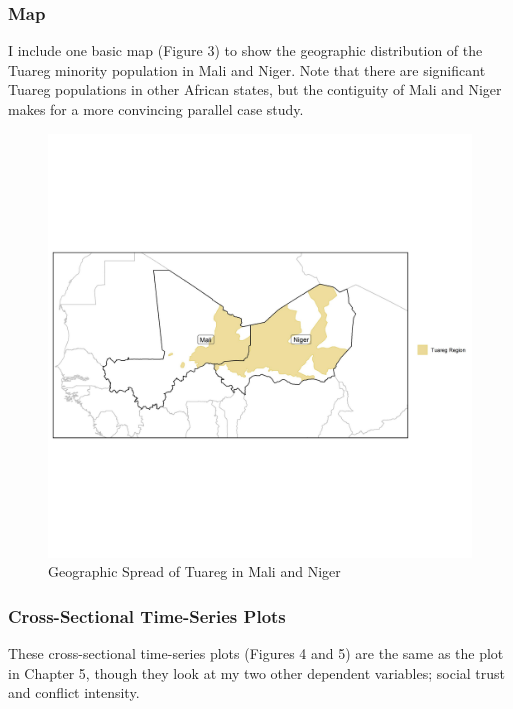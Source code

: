 \documentclass[12pt]{article}
\begin{document}
\subsubsection{Map}

I include one basic map (Figure 3) to show the geographic distribution of the Tuareg minority population in Mali and Niger. Note that there are significant Tuareg populations in other African states, but the contiguity of Mali and Niger makes for a more convincing parallel case study. 

\begin{figure}[!htbp]
	\begin{center}
		\includegraphics[width = 7in]{tuareg_map.jpeg}
	\end{center}
	\caption{Geographic Spread of Tuareg in Mali and Niger}
\end{figure}


\subsubsection{Cross-Sectional Time-Series Plots}

These cross-sectional time-series plots (Figures 4 and 5) are the same as the plot in Chapter 5, though they look at my two other dependent variables; social trust and conflict intensity.
\end{document}
